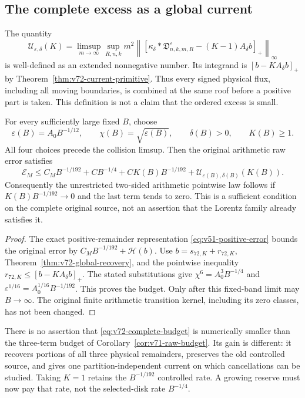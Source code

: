 \subsection{The complete excess as a global current}
The quantity
\begin{equation}\label{eq:v72-complete-current-excess}
 \mathcal U_{\varepsilon,\delta}(K)
 =\limsup_{m\to\infty}\sup_{R,n,k}m^2
   \left\|\left[\kappa_\delta*\mathfrak D^\varepsilon_{n,k,m,R}
                        -(K-1)A_\delta b\right]_+\right\|_\infty
\end{equation}
is well-defined as an extended nonnegative number. Its integrand
is $[b-KA_\delta b]_+$ by
Theorem~\ref{thm:v72-current-primitive}. Thus every signed physical
flux, including all moving boundaries, is combined at the same roof
before a positive part is taken. This definition is not a claim that
the ordered excess is small.

\begin{theorem}
\label{thm:v72-complete-budget}
For every sufficiently large fixed $B$, choose
\[
 \varepsilon(B)=A_0B^{-1/12},\qquad
 \chi(B)=\sqrt{\varepsilon(B)},\qquad
 \delta(B)>0,\qquad K(B)\ge1.
\]
All four choices precede the collision limsup. Then the original
arithmetic raw error satisfies
\begin{equation}\label{eq:v72-complete-budget}
 \mathcal E_M\le C_MB^{-1/192}+CB^{-1/4}
       +CK(B)B^{-1/192}
       +\mathcal U_{\varepsilon(B),\delta(B)}(K(B)).
\end{equation}
Consequently the unrestricted two-sided arithmetic pointwise law
follows if $K(B)B^{-1/192}\to0$ and the last term tends to zero.
This is a sufficient condition on the complete original source,
not an assertion that the Lorentz family already satisfies it.
\end{theorem}
\begin{proof}
The exact positive-remainder representation
\eqref{eq:v51-positive-error} bounds the original error by
$C_MB^{-1/192}+\mathcal H(b)$. Use
$b=s_{72,K}+r_{72,K}$, Theorem~\ref{thm:v72-global-recovery},
and the pointwise inequality
$r_{72,K}\le[b-KA_\delta b]_+$. The stated substitutions give
$\chi^6=A_0^3B^{-1/4}$ and
$\varepsilon^{1/16}=A_0^{1/16}B^{-1/192}$. This proves the
budget. Only after this fixed-band limit may $B\to\infty$.
The original finite arithmetic transition kernel, including its zero
classes, has not been changed.
\end{proof}

There is no assertion that \eqref{eq:v72-complete-budget} is
numerically smaller than the three-term budget of
Corollary~\ref{cor:v71-raw-budget}. Its gain is different: it
recovers portions of all three physical remainders, preserves the
old controlled source, and gives one partition-independent current
on which cancellations can be studied. Taking $K=1$ retains the
$B^{-1/192}$ controlled rate. A growing reserve must now pay that
rate, not the selected-disk rate $B^{-1/4}$.

